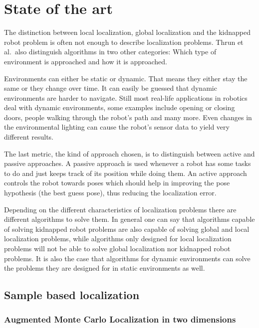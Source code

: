 \documentclass[Thesis.tex]{subfiles}
\begin{document}
\chapter{State of the art}
The distinction between local localization, global localization and the kidnapped robot problem is often not enough to describe localization problems. Thrun et al.\ also distinguish algorithms in two other categories: Which type of environment is approached and how it is approached\cite{ThrunBurgardFox:2005}.

Environments can either be static or dynamic. That means they either stay the same or they change over time. It can easily be guessed that dynamic environments are harder to navigate. Still most real-life applications in robotics deal with dynamic environments, some examples include opening or closing doors, people walking through the robot's path and many more. Even changes in the environmental lighting can cause the robot's sensor data to yield very different results. 

The last metric, the kind of approach chosen, is to distinguish between active and passive approaches. A passive approach is used whenever a robot has some tasks to do and just keeps track of its position while doing them. An active approach controls the robot towards poses which should help in improving the pose hypothesis (the best guess pose), thus reducing the localization error.

Depending on the different characteristics of localization problems there are different algorithms to solve them. In general one can say that algorithms capable of solving kidnapped robot problems are also capable of solving global and local localization problems, while algorithms only designed for local localization problems will not be able to solve global localization nor kidnapped robot problems. It is also the case that algorithms for dynamic environments can solve the problems they are designed for in static environments as well. 

\section{Sample based localization}


\subsection{Augmented Monte Carlo Localization in two dimensions}
\end{document}
